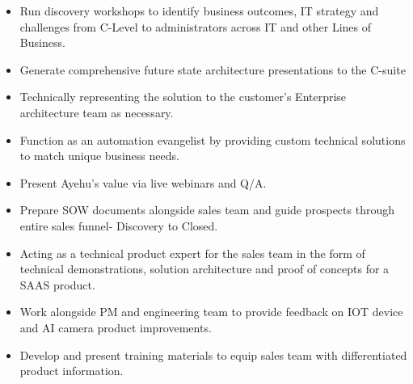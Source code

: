 \documentclass[10pt,a4paper,ragged2e,withhyper]{altacv}
\begin{document}
\begin{paracol}{2}


\begin{itemize}
\item Run discovery workshops to identify business outcomes, IT strategy and challenges from C-Level to administrators across IT and other Lines of Business.
\item Generate comprehensive future state architecture presentations to the C-suite
\item Technically representing the solution to the customer’s Enterprise architecture team as necessary.
\end{itemize}

\divider

\begin{itemize}
\item  Function as an automation evangelist by providing custom technical solutions to match unique business needs.
\item Present Ayehu’s value via live webinars and Q/A.
\item Prepare SOW documents alongside sales team and guide prospects through entire sales funnel- Discovery to Closed.
\end{itemize}

\divider

\begin{itemize}
\item  Acting as a technical product expert for the sales team in the form of technical demonstrations, solution architecture and proof of concepts for a SAAS product.
\item Work alongside PM and engineering team to provide feedback on IOT device and AI camera product improvements.
\item Develop and present training materials to equip sales team with differentiated product information.
\end{itemize}
\divider



\end{paracol}
\end{document}
